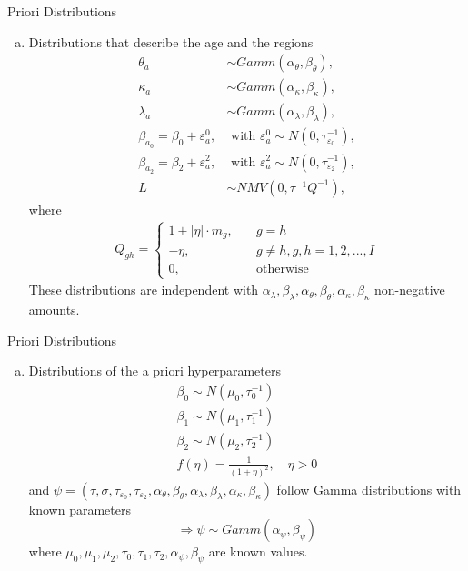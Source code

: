 \documentclass[10pt]{beamer} %
\begin{document}
\begin{frame}{Priori Distributions}
\begin{enumerate}[b)]
   \item Distributions that describe the age and the regions
	\begin{align*}
	\theta_{a}&\sim Gamm(\alpha_{\theta},\beta_{\theta}),\\
	\kappa_{a}&\sim Gamm(\alpha_{	\kappa},\beta_{	\kappa}),\\
	\lambda_{a}&\sim Gamm(\alpha_{\lambda},\beta_{\lambda}),\\
	\beta_{a_0}=\beta_0+\varepsilon_a^0,&\textrm{ with }\varepsilon_a^0\sim N(0,\tau_{\varepsilon_0}^{-1}),\\
	\beta_{a_2}=\beta_2+\varepsilon_a^2,& \textrm{ with }\varepsilon_a^2\sim N(0,\tau_{\varepsilon_2}^{-1}),\\
	L&\sim NMV(0,\tau^{-1}Q^{-1}),
	\end{align*}
	where 
	\begin{align*}
	Q_{gh}=\left\{\begin{matrix}
	1+|\eta|\cdot m_g, \quad &g=h\\
	-\eta, \quad &g\neq h,g,h=1,2,...,I\\
	0,\quad &\textrm{otherwise}
	\end{matrix}\right.
	\end{align*}
	    These distributions are independent with $\alpha_{\lambda},\beta_{\lambda},\alpha_{\theta},\beta_{\theta},\alpha_{	\kappa},\beta_{	\kappa}$ non-negative amounts.
\end{enumerate}
    
\end{frame}
\begin{frame}{Priori Distributions}
\begin{enumerate}[c)]
\item Distributions of the a priori hyperparameters
	\begin{align*}
	\beta_0\sim N(\mu_0,\tau_0^{-1})\\
	\beta_1\sim N(\mu_1,\tau_1^{-1})\\
	\beta_2\sim N(\mu_2,\tau_2^{-1})\\
	f(\eta)=\frac{1}{(1+\eta)^2},\quad \eta>0
	\end{align*}
	and $\psi=(\tau,\sigma,\tau_{\varepsilon_0},\tau_{\varepsilon_2},\alpha_{\theta},\beta_{\theta},\alpha_{\lambda},\beta_{\lambda},\alpha_{	\kappa},\beta_{	\kappa})$ follow Gamma distributions with known parameters $$\Rightarrow \psi \sim Gamm(\alpha_\psi,\beta_\psi)$$ where $\mu_0,\mu_1,\mu_2,\tau_0,\tau_1,\tau_2,\alpha_\psi,\beta_\psi$ are known values.
 \end{enumerate}   
\end{frame}
\end{document}
